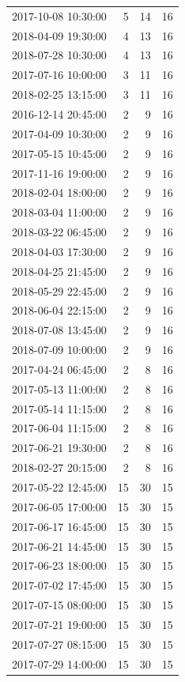 \begin{tabular}{lrrr}
2017-10-08 10:30:00 & 5 & 14 & 16 \\
2018-04-09 19:30:00 & 4 & 13 & 16 \\
2018-07-28 10:30:00 & 4 & 13 & 16 \\
2017-07-16 10:00:00 & 3 & 11 & 16 \\
2018-02-25 13:15:00 & 3 & 11 & 16 \\
2016-12-14 20:45:00 & 2 & 9 & 16 \\
2017-04-09 10:30:00 & 2 & 9 & 16 \\
2017-05-15 10:45:00 & 2 & 9 & 16 \\
2017-11-16 19:00:00 & 2 & 9 & 16 \\
2018-02-04 18:00:00 & 2 & 9 & 16 \\
2018-03-04 11:00:00 & 2 & 9 & 16 \\
2018-03-22 06:45:00 & 2 & 9 & 16 \\
2018-04-03 17:30:00 & 2 & 9 & 16 \\
2018-04-25 21:45:00 & 2 & 9 & 16 \\
2018-05-29 22:45:00 & 2 & 9 & 16 \\
2018-06-04 22:15:00 & 2 & 9 & 16 \\
2018-07-08 13:45:00 & 2 & 9 & 16 \\
2018-07-09 10:00:00 & 2 & 9 & 16 \\
2017-04-24 06:45:00 & 2 & 8 & 16 \\
2017-05-13 11:00:00 & 2 & 8 & 16 \\
2017-05-14 11:15:00 & 2 & 8 & 16 \\
2017-06-04 11:15:00 & 2 & 8 & 16 \\
2017-06-21 19:30:00 & 2 & 8 & 16 \\
2018-02-27 20:15:00 & 2 & 8 & 16 \\
2017-05-22 12:45:00 & 15 & 30 & 15 \\
2017-06-05 17:00:00 & 15 & 30 & 15 \\
2017-06-17 16:45:00 & 15 & 30 & 15 \\
2017-06-21 14:45:00 & 15 & 30 & 15 \\
2017-06-23 18:00:00 & 15 & 30 & 15 \\
2017-07-02 17:45:00 & 15 & 30 & 15 \\
2017-07-15 08:00:00 & 15 & 30 & 15 \\
2017-07-21 19:00:00 & 15 & 30 & 15 \\
2017-07-27 08:15:00 & 15 & 30 & 15 \\
2017-07-29 14:00:00 & 15 & 30 & 15 \\

\end{tabular}
